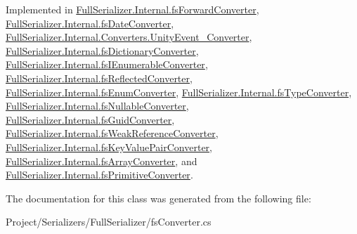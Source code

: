 Implemented in \hyperlink{class_full_serializer_1_1_internal_1_1fs_forward_converter_a252f2f0a0391e2099be798b1749a2582}{Full\+Serializer.\+Internal.\+fs\+Forward\+Converter}, \hyperlink{class_full_serializer_1_1_internal_1_1fs_date_converter_a4728edb68d03760970cb536f9c376cc0}{Full\+Serializer.\+Internal.\+fs\+Date\+Converter}, \hyperlink{class_full_serializer_1_1_internal_1_1_converters_1_1_unity_event___converter_a98db577455b325edf5035170c6297474}{Full\+Serializer.\+Internal.\+Converters.\+Unity\+Event\+\_\+\+Converter}, \hyperlink{class_full_serializer_1_1_internal_1_1fs_dictionary_converter_a00582c5fe666a61ae4d528848bdffbd7}{Full\+Serializer.\+Internal.\+fs\+Dictionary\+Converter}, \hyperlink{class_full_serializer_1_1_internal_1_1fs_i_enumerable_converter_a10f24874fda7fcb99a6a8380127dc8d0}{Full\+Serializer.\+Internal.\+fs\+I\+Enumerable\+Converter}, \hyperlink{class_full_serializer_1_1_internal_1_1fs_reflected_converter_a36c564a35f373263c7da7c4de140ba0e}{Full\+Serializer.\+Internal.\+fs\+Reflected\+Converter}, \hyperlink{class_full_serializer_1_1_internal_1_1fs_enum_converter_a93dc5222263e0354440a14a8dac74128}{Full\+Serializer.\+Internal.\+fs\+Enum\+Converter}, \hyperlink{class_full_serializer_1_1_internal_1_1fs_type_converter_afbf95621a91efff18569544dee5134fe}{Full\+Serializer.\+Internal.\+fs\+Type\+Converter}, \hyperlink{class_full_serializer_1_1_internal_1_1fs_nullable_converter_aae7da556bba4e45495162611e24e8d68}{Full\+Serializer.\+Internal.\+fs\+Nullable\+Converter}, \hyperlink{class_full_serializer_1_1_internal_1_1fs_guid_converter_af5e30658913957e51c7caa51622c2627}{Full\+Serializer.\+Internal.\+fs\+Guid\+Converter}, \hyperlink{class_full_serializer_1_1_internal_1_1fs_weak_reference_converter_ac0c327bc319e20e3648e58239ac90888}{Full\+Serializer.\+Internal.\+fs\+Weak\+Reference\+Converter}, \hyperlink{class_full_serializer_1_1_internal_1_1fs_key_value_pair_converter_acedb142bdabfb30c6cd43874734cbc33}{Full\+Serializer.\+Internal.\+fs\+Key\+Value\+Pair\+Converter}, \hyperlink{class_full_serializer_1_1_internal_1_1fs_array_converter_af02bc420e26cbf123cadecb15b06f1ed}{Full\+Serializer.\+Internal.\+fs\+Array\+Converter}, and \hyperlink{class_full_serializer_1_1_internal_1_1fs_primitive_converter_a07017626af98ba7a48a3947b7d49a08c}{Full\+Serializer.\+Internal.\+fs\+Primitive\+Converter}.



The documentation for this class was generated from the following file\+:\begin{DoxyCompactItemize}
\item 
Project/\+Serializers/\+Full\+Serializer/fs\+Converter.\+cs\end{DoxyCompactItemize}
